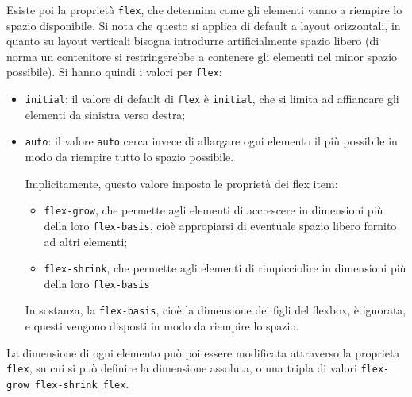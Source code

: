 \documentclass[a4paper,11pt]{article}
\begin{document}
Esiste poi la proprietà \lstinline|flex|, che determina come gli elementi vanno a riempire lo spazio disponibile.
Si nota che questo si applica di default a layout orizzontali, in quanto su layout verticali bisogna introdurre artificialmente spazio libero (di norma un contenitore si restringerebbe a contenere gli elementi nel minor spazio possibile).
Si hanno quindi i valori per \lstinline|flex|:
\begin{itemize}
	\item \lstinline|initial|: il valore di default di \lstinline|flex| è \lstinline|initial|, che si limita ad affiancare gli elementi da sinistra verso destra;
	\item \lstinline|auto|: il valore \lstinline|auto| cerca invece di allargare ogni elemento il più possibile in modo da riempire tutto lo spazio possibile.

Implicitamente, questo valore imposta le proprietà dei flex item:
\begin{itemize}
	\item \lstinline|flex-grow|, che permette agli elementi di accrescere in dimensioni più della loro \lstinline|flex-basis|, cioè appropiarsi di eventuale spazio libero fornito ad altri elementi;
	\item \lstinline|flex-shrink|, che permette agli elementi di rimpicciolire in dimensioni più della loro \lstinline|flex-basis|
\end{itemize}
In sostanza, la \lstinline|flex-basis|, cioè la dimensione dei figli del flexbox, è ignorata, e questi vengono disposti in modo da riempire lo spazio.
\end{itemize}

La dimensione di ogni elemento può poi essere modificata attraverso la proprieta \lstinline|flex|, su cui si può definire la dimensione assoluta, o una tripla di valori \lstinline|flex-grow flex-shrink flex|.
\end{document}
